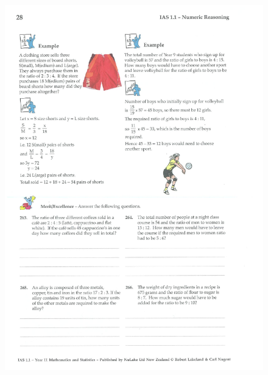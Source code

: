 \documentclass[a4paper,12pt]{article}
\begin{document}
\begin{figure}[!h]
	\centering
	\includegraphics[width=17cm]{Nulake_year10_forextension_ratio4}
\end{figure}
\end{document}
